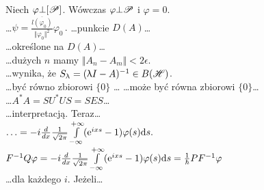 \documentclass[a4paper,11pt]{article}
\begin{document}
\noindent
{} Niech $\varphi \bot [ \mathcal{P} ]$. Wówczas $\varphi \bot \mathcal{P}$ i $\varphi = 0$. \\
 \ldots$\psi =
\frac{ \overline{ l ( \varphi_{ 0 } ) } }{ \Vert \varphi_{ 0 } \Vert^{ 2 } } \varphi_{ 0 } \, .$
 \ldots punkcie $D( A )$\ldots \\
 \ldots określone na $D( A )$\ldots \\
 \ldots dużych $n$ mamy $\Vert A_{ n } - A_{ m } \Vert < 2 \epsilon$. \\
 \ldots wynika, że $S_{ \uplambda } = ( \uplambda I - A )^{ -1 } \in B( \mathcal{H} )$. \\
 \ldots być równo zbiorowi $\{ 0 \}$ \ldots
{} \ldots może być równa zbiorowi $\{ 0 \}$\ldots \\
 \ldots$A^{ * } A = S U^{ * } U S = S E S$\ldots \\
 \ldots interpretacją. Teraz\ldots \\
 $\ldots = -i \frac{ d }{ dx } \frac{ 1 }{ \sqrt{ 2 \pi } }
\int\limits_{ -\infty }^{ +\infty } ( \mathrm{e}^{ i x s } - 1 ) \varphi( s ) \mathrm{d} s \textrm{.}$ \\
 $F^{ -1 } Q \varphi = -i \frac{ d }{ dx } \frac{ 1 }{ \sqrt{ 2 \pi } }
\int\limits_{ -\infty }^{ +\infty } ( \mathrm{e}^{ i x s } - 1 ) \varphi( s ) \mathrm{d} s
= \frac{ 1 }{ \hbar } P F^{ -1 } \varphi$ \\
 \ldots dla każdego $i$. Jeżeli\ldots





























{}






\end{document}

